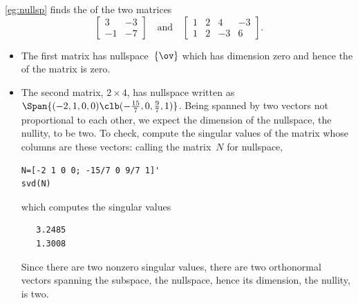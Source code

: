 \begin{example} 
\cref{eg:nullsp} finds the  of the two matrices
\begin{equation*}
\begin{bmatrix} 3&-3\\-1&-7 \end{bmatrix}
\quad\text{and}\quad
\begin{bmatrix} 1&2&4&-3\\
1&2&-3&6 \end{bmatrix}.
\end{equation*}
\begin{itemize}
\item The first matrix has nullspace~\(\{\ov\}\) which has dimension zero and hence the  of the matrix is zero.
\item The second matrix, \(2\times4\), has nullspace written as \(\Span\{(-2,1,0,0)\clb(-\frac{15}7,0,\frac97,1)\}\).
Being spanned by two vectors not proportional to each other, we expect the dimension of the nullspace, the nullity, to be two.
To check, compute the singular values of the matrix whose columns are these vectors: calling the matrix~\(N\) for nullspace,
\begin{verbatim}
N=[-2 1 0 0; -15/7 0 9/7 1]'
svd(N)
\end{verbatim}
\setbox\ajrqrbox\hbox{}%
\marginajrbox%
which computes the singular values
\begin{verbatim}
   3.2485
   1.3008
\end{verbatim}
Since there are two nonzero singular values, there are two orthonormal vectors spanning the subspace, the nullspace, hence its dimension, the nullity, is two.
\aqed

\end{itemize}
\end{example}



